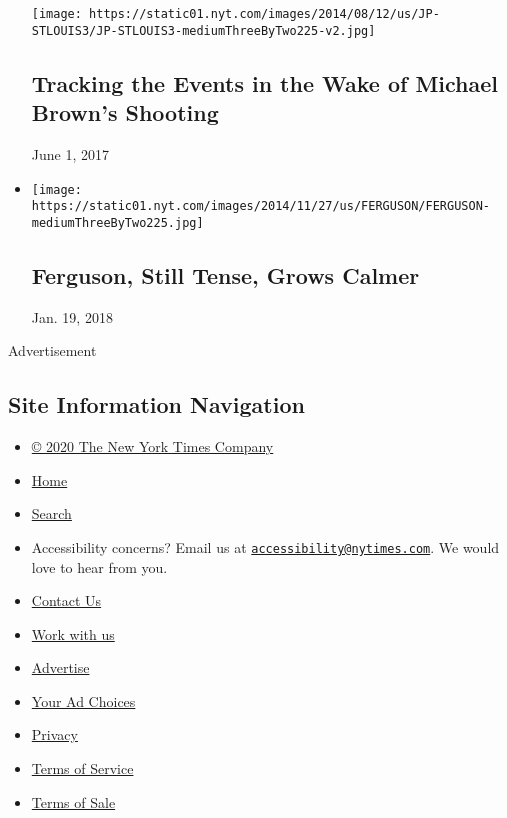 \begin{itemize}
  \texttt{[image: https://static01.nyt.com/images/2014/08/12/us/JP-STLOUIS3/JP-STLOUIS3-mediumThreeByTwo225-v2.jpg]}

  \hypertarget{tracking-the-events-in-the-wake-of-michael-browns-shooting}{%
  \subsection{Tracking the Events in the Wake of Michael Brown's
  Shooting}\label{tracking-the-events-in-the-wake-of-michael-browns-shooting}}

  June 1, 2017
\item
  \href{https://www.nytimes.com/2014/11/27/us/michael-brown-darren-wilson-ferguson-protests.html}{}

  \texttt{[image: https://static01.nyt.com/images/2014/11/27/us/FERGUSON/FERGUSON-mediumThreeByTwo225.jpg]}

  \hypertarget{ferguson-still-tense-grows-calmer}{%
  \subsection{Ferguson, Still Tense, Grows
  Calmer}\label{ferguson-still-tense-grows-calmer}}

  Jan. 19, 2018
\end{itemize}

Advertisement

\hypertarget{site-information-navigation}{%
\subsection{Site Information
Navigation}\label{site-information-navigation}}

\begin{itemize}
\tightlist
\item
  \href{https://help.nytimes.com/hc/en-us/articles/115014792127-Copyright-notice}{©
  2020 The New York Times Company}
\item
  \href{https://www.nytimes.com}{Home}
\item
  \href{https://www.nytimes.com/search/}{Search}
\item
  Accessibility concerns? Email us at
  \href{mailto:accessibility@nytimes.com}{\nolinkurl{accessibility@nytimes.com}}.
  We would love to hear from you.
\item
  \href{https://help.nytimes.com/hc/en-us/articles/115015385887-Contact-Us}{Contact
  Us}
\item
  \href{https://www.nytco.com/careers/}{Work with us}
\item
  \href{https://nytmediakit.com/}{Advertise}
\item
  \href{https://help.nytimes.com/hc/en-us/articles/115014892108-Privacy-policy\#pp}{Your
  Ad Choices}
\item
  \href{https://help.nytimes.com/hc/en-us/articles/115014892108-Privacy-policy}{Privacy}
\item
  \href{https://help.nytimes.com/hc/en-us/articles/115014893428-Terms-of-service}{Terms
  of Service}
\item
  \href{https://help.nytimes.com/hc/en-us/articles/115014893968-Terms-of-sale}{Terms
  of Sale}
\end{itemize}

